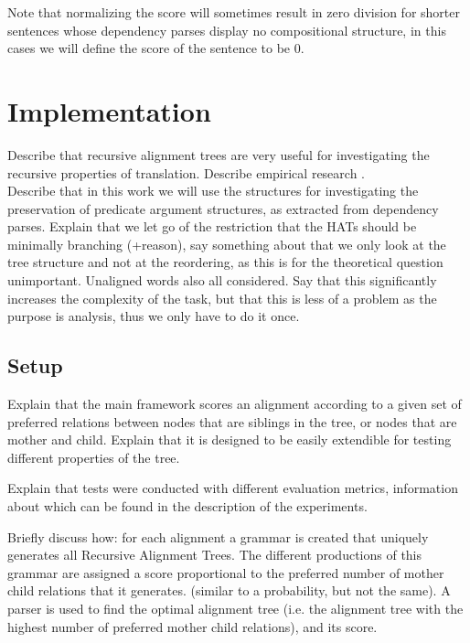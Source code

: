 \documentclass{report}
\theoremstyle{indented}
\begin{document}
Note that normalizing the score will sometimes result in zero division for shorter sentences whose dependency parses display no compositional structure, in this cases we will define the score of the sentence to be 0.


\chapter{Implementation}
\label{chapter:impl}
Describe that recursive alignment trees are very useful for investigating the recursive properties of translation. Describe empirical research \cite{simaan2013hats}.\\
Describe that in this work we will use the structures for investigating the preservation of predicate argument structures, as extracted from dependency parses. Explain that we let go of the restriction that the HATs should be minimally branching (+reason), say something about that we only look at the tree structure and not at the reordering, as this is for the theoretical question unimportant.
Unaligned words also all considered. Say that this significantly increases the complexity of the task, but that this is less of a problem as the purpose is analysis, thus we only have to do it once.



\section{Setup}

Explain that the main framework scores an alignment according to a given set of preferred relations between nodes that are siblings in the tree, or nodes that are mother and child. Explain that it is designed to be easily extendible for testing different properties of the tree.

Explain that tests were conducted with different evaluation metrics, information about which can be found in the description of the experiments.

Briefly discuss how: for each alignment a grammar is created that uniquely generates all Recursive Alignment Trees. The different productions of this grammar are assigned a score proportional to the preferred number of mother child relations that it generates. (similar to a probability, but not the same). A parser is used to find the optimal alignment tree (i.e. the alignment tree with the highest number of preferred mother child relations), and its score.
\end{document}
